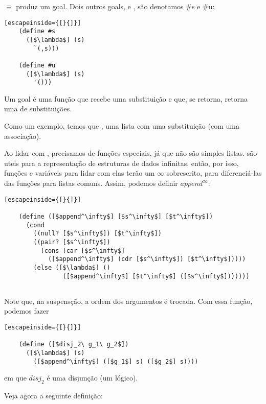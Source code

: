   \noindent $\equiv $ produz um goal. Dois outros goals, 
  e , são denotamos \#s e \#u:\\

  \begin{lstlisting}[escapeinside={[}{]}]
    (define #s
      ([$\lambda$] (s)
        `(,s)))

    (define #u
      ([$\lambda$] (s)
        '()))
  \end{lstlisting}

  Um goal é uma função que recebe uma substituição e que, se retorna,
  retorna uma  de substituições.

  Como um exemplo, temos que  \seta
  , uma lista com uma substituição (com uma
  associação).

  Ao lidar com , precisamos de funções especiais,
  já que não são simples listas.  são uteis para a
  representação de estruturas de dados infinitas, então, por isso,
  funções e variáveis para lidar com elas terão um $\infty$ sobrescrito,
  para diferenciá-las das funções para listas comuns. Assim, podemos
  definir $append^\infty$:

  \begin{lstlisting}[escapeinside={[}{]}]

    (define ([$append^\infty$] [$s^\infty$] [$t^\infty$])
      (cond
        ((null? [$s^\infty$]) [$t^\infty$])
        ((pair? [$s^\infty$])
          (cons (car [$s^\infty$]
            ([$append^\infty$] (cdr [$s^\infty$]) [$t^\infty$]))))
        (else ([$\lambda$] ()
                ([$append^\infty$] [$t^\infty$] ([$s^\infty$]))))))
        
  \end{lstlisting}

  \noindent Note que, na suspensção, a ordem dos argumentos é trocada.
  Com essa função, podemos fazer

  \begin{lstlisting}[escapeinside={[}{]}]

    (define ([$disj_2\ g_1\ g_2$])
      ([$\lambda$] (s)
        ([$append^\infty$] ([$g_1$] s) ([$g_2$] s))))

  \end{lstlisting}
      
  \noindent em que $disj_2$ é uma disjunção (um 
  lógico). 

  Veja agora a seguinte definição:

